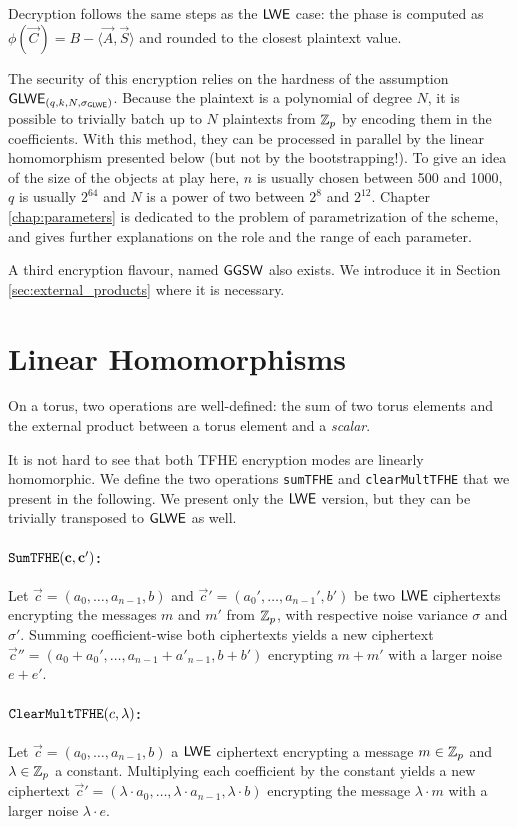 Decryption follows the same steps as the $\textsf{LWE}$ case: the phase is computed as $\phi(\vec C) = B - \langle \vec A, \vec S \rangle$ and rounded to the closest plaintext value.


The security of this encryption relies on the hardness of the assumption $\textsf{GLWE}_{(q, k, N, \sigma_{\textsf{GLWE}})}$. Because the plaintext is a polynomial of degree $N$, it is possible to trivially batch up to $N$ plaintexts from $\mathbb{Z}_p$ by encoding them in the coefficients. With this method, they can be processed in parallel by the linear homomorphism presented below (but not by the bootstrapping!).
\medskip
To give an idea of the size of the objects at play here, $n$ is usually chosen between 500 and 1000, $q$ is usually $2^{64}$ and $N$ is a power of two between $2^8$ and $2^{12}$. Chapter \ref{chap:parameters} is dedicated to the problem of parametrization of the scheme, and gives further explanations on the role and the range of each parameter.

A third encryption flavour, named $\textsf{GGSW}$ also exists. We introduce it in Section \ref{sec:external_products} where it is necessary.


\section{Linear Homomorphisms}

On a torus, two operations are well-defined: the sum of two torus elements and the external product between a torus element and a \textit{scalar}.

It is not hard to see that both TFHE encryption modes are linearly homomorphic. We define the two operations \texttt{sumTFHE} and \texttt{clearMultTFHE} that we present in the following. We present only the $\textsf{LWE}$ version, but they can be trivially transposed to $\textsf{GLWE}$ as well.


\paragraph{$\texttt{SumTFHE}(\mathbf c, \mathbf c')$:} Let $\vec c = (a_0, \dots, a_{n-1}, b)$ and $\vec c' = (a_0', \dots, a_{n-1}', b')$ be two $\textsf{LWE}$ ciphertexts encrypting the messages $m$ and $m'$ from $\mathbb{Z}_p$, with respective noise variance $\sigma$ and $\sigma'$. Summing coefficient-wise both ciphertexts yields a new ciphertext $\vec c'' = (a_0 + a_0', \dots, a_{n-1} + a'_{n-1}, b + b')$ encrypting $m + m'$ with a larger noise $e + e'$.


\paragraph{$\texttt{ClearMultTFHE}(c, \lambda)$:} Let $\vec c = (a_0, \dots, a_{n-1}, b)$ a $\textsf{LWE}$ ciphertext encrypting a message $m \in \mathbb{Z}_p$ and $\lambda \in \mathbb{Z}_p$ a constant. Multiplying each coefficient by the constant yields a new ciphertext $\vec c' = (\lambda \cdot a_0, \dots, \lambda \cdot a_{n-1}, \lambda \cdot b)$ encrypting the message $\lambda \cdot m$ with a larger noise $\lambda \cdot e$.


